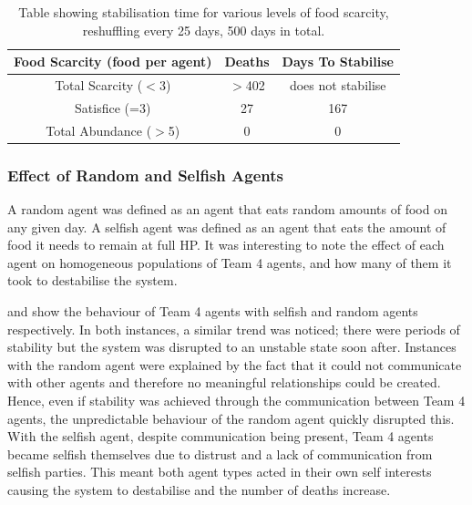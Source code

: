 \begin{table}[htb]
    \centering
    \begin{tabular}{|c|c|c|}
    \hline
    Food Scarcity (food per agent) & Deaths & Days To Stabilise  \\
        \hline
        \hline
        Total Scarcity ($<$3) & $>$402 & does not stabilise \\
        \hline
        Satisfice (=3) & 27 & 167 \\
        \hline
        Total Abundance ($>$5) & 0 & 0 \\
        \hline
    \end{tabular}
    \caption{Table showing stabilisation time for various levels of food scarcity, reshuffling every 25 days, 500 days in total.}
    \label{tab:scarcityStabilisationTimes}
\end{table}

\subsubsection{Effect of Random and Selfish Agents}

A random agent was defined as an agent that eats random amounts of food on any given day. A selfish agent was defined as an agent that eats the amount of food it needs to remain at full HP. It was interesting to note the effect of each agent on homogeneous populations of Team 4 agents, and how many of them it took to destabilise the system.

 and  show the behaviour of Team 4 agents with selfish and random agents respectively. In both instances, a similar trend was noticed; there were periods of stability but the system was disrupted to an unstable state soon after. Instances with the random agent were explained by the fact that it could not communicate with other agents and therefore no meaningful relationships could be created. Hence, even if stability was achieved through the communication between Team 4 agents, the unpredictable behaviour of the random agent quickly disrupted this. 
\newline
With the selfish agent, despite communication being present, Team 4 agents became selfish themselves due to distrust and a lack of communication from selfish parties. This meant both agent types acted in their own self interests causing the system to destabilise and the number of deaths increase.

